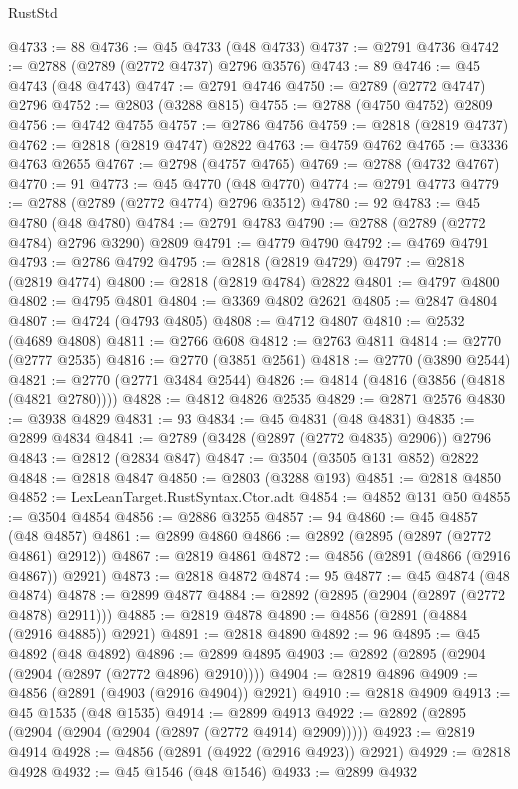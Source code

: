 \begin{lexlean}{RustStd}
\begin{coremodule}
@4733 := 88
@4736 := @45 @4733 (@48 @4733)
@4737 := @2791 @4736
@4742 := @2788 (@2789 (@2772 @4737) @2796 @3576)
@4743 := 89
@4746 := @45 @4743 (@48 @4743)
@4747 := @2791 @4746
@4750 := @2789 (@2772 @4747) @2796
@4752 := @2803 (@3288 @815)
@4755 := @2788 (@4750 @4752) @2809
@4756 := @4742 @4755
@4757 := @2786 @4756
@4759 := @2818 (@2819 @4737)
@4762 := @2818 (@2819 @4747) @2822
@4763 := @4759 @4762
@4765 := @3336 @4763 @2655
@4767 := @2798 (@4757 @4765)
@4769 := @2788 (@4732 @4767)
@4770 := 91
@4773 := @45 @4770 (@48 @4770)
@4774 := @2791 @4773
@4779 := @2788 (@2789 (@2772 @4774) @2796 @3512)
@4780 := 92
@4783 := @45 @4780 (@48 @4780)
@4784 := @2791 @4783
@4790 := @2788 (@2789 (@2772 @4784) @2796 @3290) @2809
@4791 := @4779 @4790
@4792 := @4769 @4791
@4793 := @2786 @4792
@4795 := @2818 (@2819 @4729)
@4797 := @2818 (@2819 @4774)
@4800 := @2818 (@2819 @4784) @2822
@4801 := @4797 @4800
@4802 := @4795 @4801
@4804 := @3369 @4802 @2621
@4805 := @2847 @4804
@4807 := @4724 (@4793 @4805)
@4808 := @4712 @4807
@4810 := @2532 (@4689 @4808)
@4811 := @2766 @608
@4812 := @2763 @4811
@4814 := @2770 (@2777 @2535)
@4816 := @2770 (@3851 @2561)
@4818 := @2770 (@3890 @2544)
@4821 := @2770 (@2771 @3484 @2544)
@4826 := @4814 (@4816 (@3856 (@4818 (@4821 @2780))))
@4828 := @4812 @4826 @2535
@4829 := @2871 @2576
@4830 := @3938 @4829
@4831 := 93
@4834 := @45 @4831 (@48 @4831)
@4835 := @2899 @4834
@4841 := @2789 (@3428 (@2897 (@2772 @4835) @2906)) @2796
@4843 := @2812 (@2834 @847)
@4847 := @3504 (@3505 @131 @852) @2822
@4848 := @2818 @4847
@4850 := @2803 (@3288 @193)
@4851 := @2818 @4850
@4852 := LexLeanTarget.RustSyntax.Ctor.adt
@4854 := @4852 @131 @50
@4855 := @3504 @4854
@4856 := @2886 @3255
@4857 := 94
@4860 := @45 @4857 (@48 @4857)
@4861 := @2899 @4860
@4866 := @2892 (@2895 (@2897 (@2772 @4861) @2912))
@4867 := @2819 @4861
@4872 := @4856 (@2891 (@4866 (@2916 @4867)) @2921)
@4873 := @2818 @4872
@4874 := 95
@4877 := @45 @4874 (@48 @4874)
@4878 := @2899 @4877
@4884 := @2892 (@2895 (@2904 (@2897 (@2772 @4878) @2911)))
@4885 := @2819 @4878
@4890 := @4856 (@2891 (@4884 (@2916 @4885)) @2921)
@4891 := @2818 @4890
@4892 := 96
@4895 := @45 @4892 (@48 @4892)
@4896 := @2899 @4895
@4903 := @2892 (@2895 (@2904 (@2904 (@2897 (@2772 @4896) @2910))))
@4904 := @2819 @4896
@4909 := @4856 (@2891 (@4903 (@2916 @4904)) @2921)
@4910 := @2818 @4909
@4913 := @45 @1535 (@48 @1535)
@4914 := @2899 @4913
@4922 := @2892 (@2895 (@2904 (@2904 (@2904 (@2897 (@2772 @4914) @2909)))))
@4923 := @2819 @4914
@4928 := @4856 (@2891 (@4922 (@2916 @4923)) @2921)
@4929 := @2818 @4928
@4932 := @45 @1546 (@48 @1546)
@4933 := @2899 @4932

\end{coremodule}
\end{lexlean}

